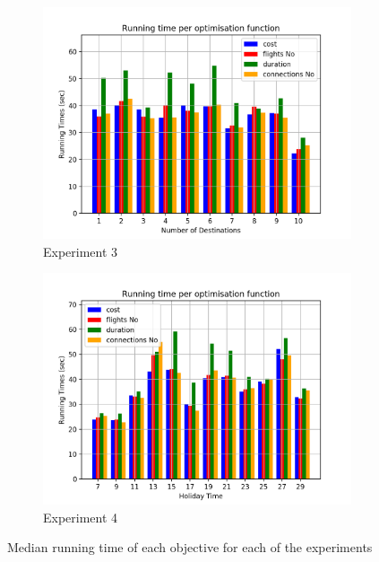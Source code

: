 \documentclass{mpaper}
\begin{document}
\begin{figure}
\begin{subfigure}[b]{0.4\textwidth}
        \includegraphics[width=\textwidth]{images/experiments/varyd/varyD_obj.png}
        \caption{Experiment 3}
        \label{fig:exp3obj}
    \end{subfigure}
    \begin{subfigure}[b]{0.4\textwidth}
        \includegraphics[width=\textwidth]{images/experiments/varyt/varyT_obj.png}
        \caption{Experiment 4}
        \label{fig:exp4obj}
    \end{subfigure}
    \caption{Median running time of each objective for each of the experiments}
\end{figure}
\end{document}
